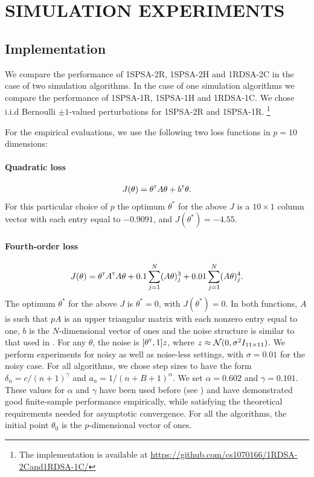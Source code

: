 \section{SIMULATION EXPERIMENTS}
\label{sec:expts}
\subsection{Implementation}
We compare the performance of 1SPSA-2R, 1SPSA-2H and 1RDSA-2C in the case of 
two simulation algorithms. In the case of one simulation algorithms we compare the 
performance of 1SPSA-1R, 1SPSA-1H and 1RDSA-1C. 
We chose i.i.d Bernoulli $\pm 1$-valued perturbations for 1SPSA-2R and 1SPSA-1R.
\footnote{The implementation is available at 
\url{https://github.com/cs1070166/1RDSA-2Cand1RDSA-1C/}}

For the empirical evaluations, 
we use the following two loss functions in $p=10$ dimensions:
\paragraph{Quadratic loss}
\begin{align}
J(\theta) = \theta^\mathsf{\scriptscriptstyle T} A \theta + b^\mathsf{\scriptscriptstyle T} \theta. \label{eq:quadratic}
\end{align} 
For this particular choice of $p$ the optimum $\theta^*$ for the above $J$ is 
a $10 \times 1$ column vector with each entry equal to 
$-0.9091$, and $J(\theta^*) = -4.55$.

\paragraph{Fourth-order loss}
\begin{align} 
J(\theta) = \theta ^\mathsf{\scriptscriptstyle T} A^\mathsf{\scriptscriptstyle T} A\theta+0.1 \sum_{j=1}^N (A\theta)^3_j+0.01 \sum_{j=1}^N (A\theta)^4_j.\label{eq:4thorder}
 \end{align} 
The optimum $\theta^*$ for the above $J$ is $\theta^*=0$, with $J(\theta^*) = 0$. 
In both functions, $A$ is such that $pA$ is an upper triangular matrix with each 
nonzero entry equal to one, $b$ is the $N$-dimensional vector of ones and 
the noise structure is similar to that used in \cite{spall_adaptive}. 
For any $\theta$, the noise is $[\theta^\mathsf{\scriptscriptstyle T}, 1]z$, where $z \approx \mathcal{N}(0,\sigma^2 I_{11\times11})$.
We perform experiments for noisy as well as noise-less settings, with $\sigma=0.01$ for
the noisy case. 
For all algorithms, we chose step sizes to have the form 
$\delta_n = c/(n+1)^{\gamma}$ and $a_n = 1/(n+B+1)^{\alpha}$.
We set $\alpha=0.602$ and $\gamma=0.101$.
These values for $\alpha$ and $\gamma$ have been used  before (see 
\cite{spall_adaptive}) and have demonstrated good finite-sample performance 
empirically, while satisfying the theoretical requirements needed for asymptotic 
convergence.  For all the algorithms, the initial point $\theta_0$ is the 
$p$-dimensional vector of ones.
